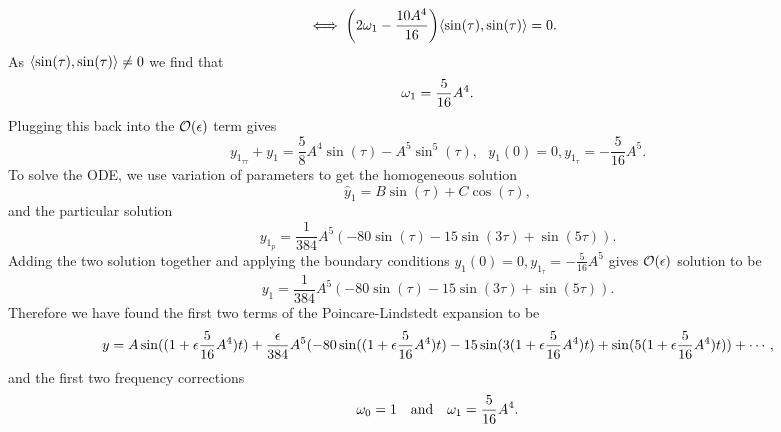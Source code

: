 \documentclass[12pt]{report}
\begin{document}
\begin{solution}
\begin{enumerate}
\begin{align*}
            &\iff {\left(2\omega_1 - \frac{10A^4}{16}\right)}{\left\langle\sin(\tau), \sin(\tau)\right\rangle} = 0.
        \end{align*} 
        As ${\left\langle\sin(\tau), \sin(\tau)\right\rangle} \neq 0$ we find that
        \[ 
            \omega_1 = \frac{5}{16}A^4.
        \]
        Plugging this back into the ${\mathcal{O}}({\epsilon})$ term gives
        \[ 
            y_{1_{\tau \tau}} + y_1 = \frac{5}{8}A^4\sin(\tau) - A^5 \sin^5(\tau), ~~~ y_1(0) = 0,  y_{1_\tau} = - \frac{5}{16}A^5.
        \]
        To solve the ODE, we use variation of parameters to get the homogeneous solution
        \[ 
            \hat{y}_1 = B\sin(\tau) + C\cos(\tau),
        \]
        and the particular solution 
        \[ 
            y_{1_p} = \frac{1}{384} A^5 (-80 \sin (\tau)-15 \sin (3 \tau)+\sin (5 \tau)).
        \]
        Adding the two solution together and applying the boundary conditions $y_1(0) = 0,  y_{1_\tau} = - \frac{5}{16}A^5$ gives ${\mathcal{O}}({\epsilon})$ solution to be
        \[ 
            y_1 = \frac{1}{384} A^5 (-80 \sin (\tau)-15 \sin (3 \tau)+\sin (5 \tau)).
        \]
        Therefore we have found the first two terms of the Poincare-Lindstedt expansion to be
        \[ 
            y = A\sin((1 + {\epsilon}\frac{ 5}{16}A^4)t) + \frac{{\epsilon}}{384} A^5 (-80 \sin ((1 + {\epsilon}\frac{ 5}{16}A^4)t)-15 \sin (3 (1 + {\epsilon}\frac{ 5}{16}A^4)t)+\sin (5 (1 + {\epsilon}\frac{ 5}{16}A^4)t)) + \cdots,
        \] 
        and the first two frequency corrections
        \[ 
            \omega_0 = 1 ~~~ \text{and}~~~ \omega_1 = \frac{5}{16}A^4.
        \]



\end{enumerate}
\end{solution}
\end{document}
